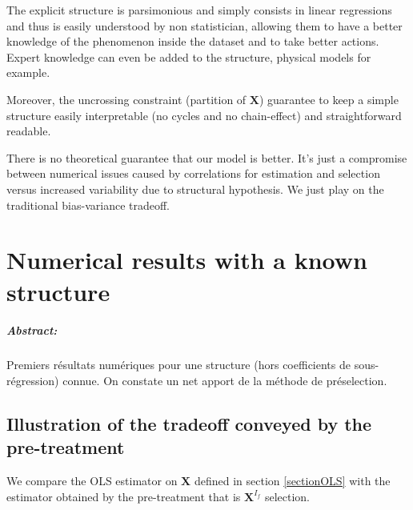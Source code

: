 \documentclass[12pt,a4paper]{report}
\begin{document}
The explicit structure is parsimonious and simply consists in linear regressions and thus is easily understood by non statistician, allowing them to have a better knowledge of the phenomenon inside the dataset and to take better actions. Expert knowledge can even be added to the structure, physical models for example.

Moreover, the uncrossing constraint (partition of $\boldsymbol{X}$) guarantee to keep a simple structure easily interpretable (no cycles and no chain-effect) and straightforward readable.

	
			There is no theoretical guarantee that our model is better. It's just a compromise between numerical issues caused by correlations for estimation and selection versus increased variability due to structural hypothesis. We just play on the traditional bias-variance tradeoff. 
\chapter{Numerical results with a known structure}	
\paragraph{Abstract:} Premiers résultats numériques pour une structure (hors coefficients de sous-régression) connue. On constate un net apport de la méthode de préselection.
		 
	\section{Illustration of the tradeoff conveyed by the pre-treatment}	
	We compare the OLS estimator on $\boldsymbol{X}$ defined in section \ref{sectionOLS} with the estimator obtained by the pre-treatment that is $\boldsymbol{X}^{I_f}$ selection.
  
\end{document}
